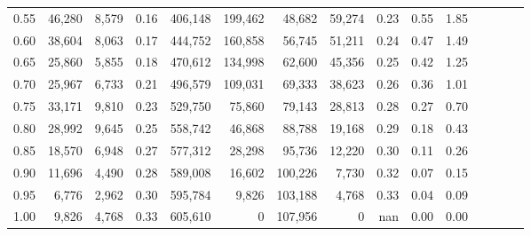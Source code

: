\begin{tabular}{rrrcrrrrrrrrrrr}
0.55 &  46,280 &  8,579 &                                       0.16 &  406,148 &  199,462 &   48,682 &   59,274 &  0.23 &  0.55 &                         1.85 \\
0.60 &  38,604 &  8,063 &                                       0.17 &  444,752 &  160,858 &   56,745 &   51,211 &  0.24 &  0.47 &                         1.49 \\
0.65 &  25,860 &  5,855 &                                       0.18 &  470,612 &  134,998 &   62,600 &   45,356 &  0.25 &  0.42 &                         1.25 \\
0.70 &  25,967 &  6,733 &                                       0.21 &  496,579 &  109,031 &   69,333 &   38,623 &  0.26 &  0.36 &                         1.01 \\
0.75 &  33,171 &  9,810 &                                       0.23 &  529,750 &   75,860 &   79,143 &   28,813 &  0.28 &  0.27 &                         0.70 \\
0.80 &  28,992 &  9,645 &                                       0.25 &  558,742 &   46,868 &   88,788 &   19,168 &  0.29 &  0.18 &                         0.43 \\
0.85 &  18,570 &  6,948 &                                       0.27 &  577,312 &   28,298 &   95,736 &   12,220 &  0.30 &  0.11 &                         0.26 \\
0.90 &  11,696 &  4,490 &                                       0.28 &  589,008 &   16,602 &  100,226 &    7,730 &  0.32 &  0.07 &                         0.15 \\
0.95 &   6,776 &  2,962 &                                       0.30 &  595,784 &    9,826 &  103,188 &    4,768 &  0.33 &  0.04 &                         0.09 \\
1.00 &   9,826 &  4,768 &                                       0.33 &  605,610 &        0 &  107,956 &        0 &   nan &  0.00 &                         0.00 \\
\bottomrule
\end{tabular}
